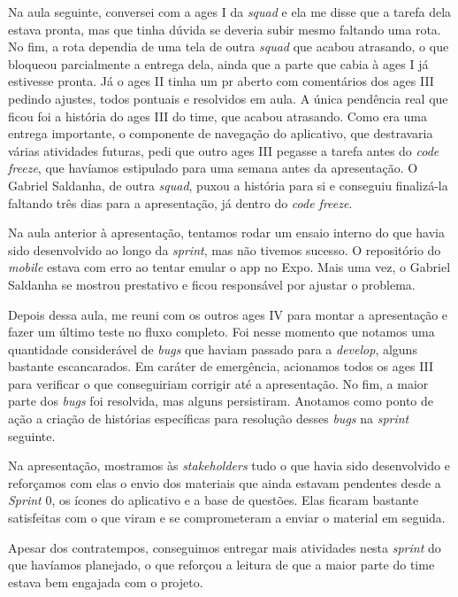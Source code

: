 Na aula seguinte, conversei com a \ac{ages} I da \textit{squad} e ela me disse que a tarefa dela estava pronta, mas que tinha dúvida se deveria subir mesmo faltando uma rota. No fim, a rota dependia de uma tela de outra \textit{squad} que acabou atrasando, o que bloqueou parcialmente a entrega dela, ainda que a parte que cabia à \ac{ages} I já estivesse pronta. Já o \ac{ages} II tinha um \ac{pr} aberto com comentários dos \ac{ages} III pedindo ajustes, todos pontuais e resolvidos em aula. A única pendência real que ficou foi a história do \ac{ages} III do time, que acabou atrasando. Como era uma entrega importante, o componente de navegação do aplicativo, que destravaria várias atividades futuras, pedi que outro \ac{ages} III pegasse a tarefa antes do \textit{code freeze}, que havíamos estipulado para uma semana antes da apresentação. O Gabriel Saldanha, de outra \textit{squad}, puxou a história para si e conseguiu finalizá-la faltando três dias para a apresentação, já dentro do \textit{code freeze}.

Na aula anterior à apresentação, tentamos rodar um ensaio interno do que havia sido desenvolvido ao longo da \textit{sprint}, mas não tivemos sucesso. O repositório do \textit{mobile} estava com erro ao tentar emular o app no Expo. Mais uma vez, o Gabriel Saldanha se mostrou prestativo e ficou responsável por ajustar o problema.

Depois dessa aula, me reuni com os outros \ac{ages} IV para montar a apresentação e fazer um último teste no fluxo completo. Foi nesse momento que notamos uma quantidade considerável de \textit{bugs} que haviam passado para a \textit{develop}, alguns bastante escancarados. Em caráter de emergência, acionamos todos os \ac{ages} III para verificar o que conseguiriam corrigir até a apresentação. No fim, a maior parte dos \textit{bugs} foi resolvida, mas alguns persistiram. Anotamos como ponto de ação a criação de histórias específicas para resolução desses \textit{bugs} na \textit{sprint} seguinte.

Na apresentação, mostramos às \textit{stakeholders} tudo o que havia sido desenvolvido e reforçamos com elas o envio dos materiais que ainda estavam pendentes desde a \textit{Sprint} 0, os ícones do aplicativo e a base de questões. Elas ficaram bastante satisfeitas com o que viram e se comprometeram a enviar o material em seguida.

Apesar dos contratempos, conseguimos entregar mais atividades nesta \textit{sprint} do que havíamos planejado, o que reforçou a leitura de que a maior parte do time estava bem engajada com o projeto.

